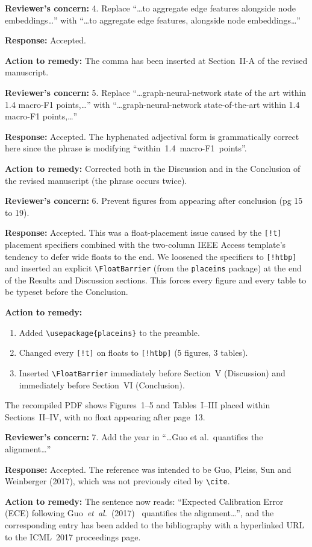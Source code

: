 \documentclass[11pt,a4paper]{article}
\newcommand{\Concern}[1]{\smallskip\noindent\textbf{\textcolor{concern}{Reviewer's concern:}} #1\par}
\newcommand{\Response}[1]{\noindent\textbf{\textcolor{response}{Response:}} #1\par}
\newcommand{\Action}[1]{\noindent\textbf{\textcolor{action}{Action to remedy:}} #1\par}
\begin{document}
\Concern{4. Replace ``\ldots to aggregate edge features alongside node embeddings\ldots'' with ``\ldots to aggregate edge features, alongside node embeddings\ldots''}
\Response{Accepted.}
\Action{The comma has been inserted at Section~II-A of the revised manuscript.}

\Concern{5. Replace ``\ldots graph-neural-network state of the art within 1.4 macro-F1 points,\ldots'' with ``\ldots graph-neural-network state-of-the-art within 1.4 macro-F1 points,\ldots''}
\Response{Accepted. The hyphenated adjectival form is grammatically correct here since the phrase is modifying ``within~1.4~macro-F1~points''.}
\Action{Corrected both in the Discussion and in the Conclusion of the revised manuscript (the phrase occurs twice).}

\Concern{6. Prevent figures from appearing after conclusion (pg 15 to 19).}
\Response{Accepted. This was a float-placement issue caused by the \texttt{[!t]} placement specifiers combined with the two-column IEEE Access template's tendency to defer wide floats to the end. We loosened the specifiers to \texttt{[!htbp]} and inserted an explicit \texttt{\textbackslash FloatBarrier} (from the \texttt{placeins} package) at the end of the Results and Discussion sections. This forces every figure and every table to be typeset before the Conclusion.}
\Action{
\begin{enumerate}[label=(\alph*),leftmargin=1.5em,itemsep=1pt,topsep=1pt]
  \item Added \texttt{\textbackslash usepackage\{placeins\}} to the preamble.
  \item Changed every \texttt{[!t]} on floats to \texttt{[!htbp]} (5 figures, 3 tables).
  \item Inserted \texttt{\textbackslash FloatBarrier} immediately before Section~V (Discussion) and immediately before Section~VI (Conclusion).
\end{enumerate}
The recompiled PDF shows Figures~1--5 and Tables~I--III placed within Sections~II--IV, with no float appearing after page~13.}

\Concern{7. Add the year in ``\ldots Guo et al.\ quantifies the alignment\ldots''}
\Response{Accepted. The reference was intended to be Guo, Pleiss, Sun and Weinberger (2017), which was not previously cited by \texttt{\textbackslash cite}.}
\Action{The sentence now reads: ``Expected Calibration Error (ECE) following Guo~\emph{et~al.}~(2017)~\cite{guo2017calibration} quantifies the alignment\ldots'', and the corresponding entry has been added to the bibliography with a hyperlinked URL to the ICML~2017 proceedings page.}
\end{document}

